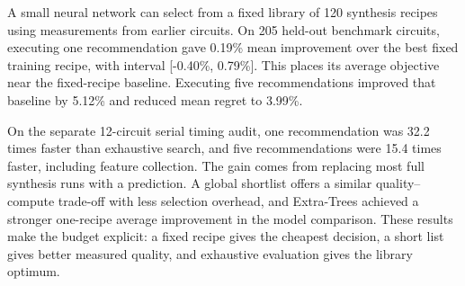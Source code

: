 A small neural network can select from a fixed library of 120 synthesis recipes using measurements from earlier circuits. On 205 held-out benchmark circuits, executing one recommendation gave 0.19\% mean improvement over the best fixed training recipe, with interval [-0.40\%, 0.79\%]. This places its average objective near the fixed-recipe baseline. Executing five recommendations improved that baseline by 5.12\% and reduced mean regret to 3.99\%.

On the separate 12-circuit serial timing audit, one recommendation was 32.2 times faster than exhaustive search, and five recommendations were 15.4 times faster, including feature collection. The gain comes from replacing most full synthesis runs with a prediction. A global shortlist offers a similar quality--compute trade-off with less selection overhead, and Extra-Trees achieved a stronger one-recipe average improvement in the model comparison. These results make the budget explicit: a fixed recipe gives the cheapest decision, a short list gives better measured quality, and exhaustive evaluation gives the library optimum.

